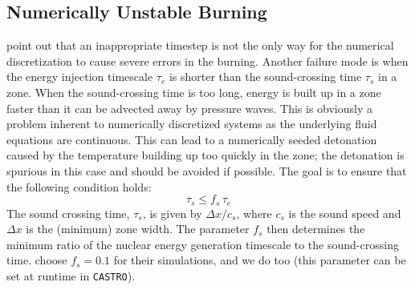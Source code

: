 \documentclass[twocolumn,numberedappendix]{../aastex6}
\newcommand{\castro}{\texttt{CASTRO}}
\begin{document}
\subsection{Numerically Unstable Burning}
\label{sec:unstable_burning}

\citet{kushnir:2013} point out that an inappropriate timestep is 
not the only way for the numerical discretization to cause 
severe errors in the burning. Another failure mode is when
the energy injection timescale
$\tau_e$ is shorter than the sound-crossing time $\tau_s$ in a zone.
When the sound-crossing time is too long, energy is built up in
a zone faster than it can be advected away by pressure waves.
This is obviously a problem inherent to numerically discretized
systems as the underlying fluid equations are continuous.
This can lead to a numerically seeded detonation caused by the
temperature building up too quickly in the zone; the detonation
is spurious in this case and should be avoided if possible.
The goal is to ensure that the following condition holds:
\begin{equation}
  \tau_s \leq f_{s}\, \tau_e \label{eq:burning_limiter_2}
\end{equation}
The sound crossing time, $\tau_s$, is given by $\Delta x / c_s$, 
where $c_s$ is the sound speed and $\Delta x$ is the (minimum) 
zone width. The parameter $f_{s}$ then determines the minimum
ratio of the nuclear energy generation timescale to the 
sound-crossing time. \citet{kushnir:2013} choose $f_{s} = 0.1$ 
for their simulations, and we do too (this parameter can be set 
at runtime in \castro).
\end{document}
